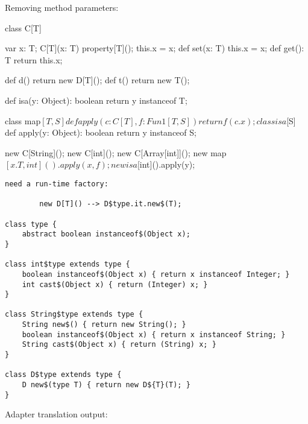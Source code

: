 \documentclass{llncs}
\begin{document}
Removing method parameters:
\begin{displayxten}
class C[T] {
    var x: T;
    C[T](x: T) { property[T](); this.x = x; }
    def set(x: T) { this.x = x; }
    def get(): T { return this.x; }

    def d() { return new D[T](); }
    def t() { return new T(); }

    def isa(y: Object): boolean { return y instanceof T; }
}

    class map$[T,S] {
        def apply(c: C[T], f: Fun1[T,S]) { return f(c.x); }
    }

    class isa$[S] {
        def apply(y: Object): boolean { return y instanceof S; }
    }

new C[String]();
new C[int]();
new C[Array[int]]();
new map$[x.T,int]().apply(x,f);
new isa$[int]().apply(y);
\end{displayxten}


\begin{verbatim}
need a run-time factory:

        new D[T]() --> D$type.it.new$(T);

class type {
    abstract boolean instanceof$(Object x);
}

class int$type extends type {
    boolean instanceof$(Object x) { return x instanceof Integer; }
    int cast$(Object x) { return (Integer) x; }
}

class String$type extends type {
    String new$() { return new String(); }
    boolean instanceof$(Object x) { return x instanceof String; }
    String cast$(Object x) { return (String) x; }
}

class D$type extends type {
    D new$(type T) { return new D${T}(T); }
}
\end{verbatim}


Adapter translation output:
\end{document}
